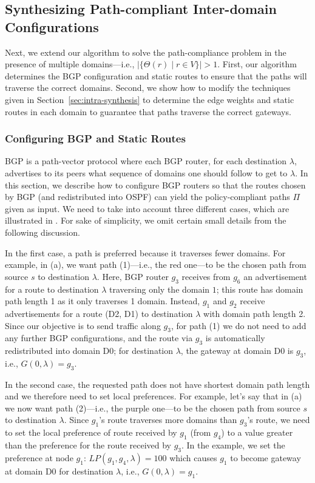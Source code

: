 \subsection{Synthesizing Path-compliant  Inter-domain Configurations}
\label{sec:inter-synthesis}

Next, we extend our algorithm to
solve the path-compliance problem in the presence
of multiple domains---i.e., $|\{\Theta(r) \mid r\in V\}|>1$.
First, our algorithm determines the 
BGP configuration and static routes to ensure that the 
paths will traverse the correct domains.
Second, we show how to modify the 
techniques given in Section~\ref{sec:intra-synthesis}
to determine the edge weights and static routes
 in each domain to guarantee that paths traverse
the correct gateways.


\subsubsection{Configuring BGP and Static Routes}
BGP is a path-vector protocol where each BGP router,
for each destination $\lambda$,
advertises to its peers
what sequence of domains one should follow to get to  $\lambda$.  
In this section, we describe how to configure
BGP routers so that the routes chosen by BGP 
(and redistributed into OSPF) 
can yield the policy-compliant
paths $\Pi$ given as input. 
We need to take into account three different
cases, which are illustrated in .  
For sake of simplicity, we omit certain small details 
from the following discussion.

In the first case, a path is preferred because it traverses fewer domains.
For example, in (a), we want
path (1)---i.e., the red one---to be the chosen path from source $s$ 
to destination $\lambda$.
Here, BGP router $g_3$ receives from $g_6$ an advertisement for a route to destination $\lambda$
traversing only the domain $1$; this route has domain path length 1 as it only traverses 1 domain. 
Instead, $g_1$ and $g_2$ receive advertisements for a route 
(D2, D1)
to destination $\lambda$  with 
domain path length 2. Since our objective is to send traffic along
$g_3$, for path (1) we do not need to add any further BGP configurations,
and the route via $g_3$ is automatically redistributed into domain D0;
for destination $\lambda$, the gateway at domain D0 is $g_3$, i.e.,
$G(0, \lambda) = g_3$.

In the second case, the requested path does not have shortest domain path length
and we therefore need to set local preferences.
For example, let's say that in (a) we now want
path (2)---i.e., the purple one---to be the chosen path from source $s$
to destination $\lambda$. 
Since $g_1$'s route traverses more domains than
 $g_3$'s route,
we need to set the local preference of route received by $g_1$ 
(from $g_4$) to a value greater than the preference for the route received by $g_3$. 
In the example, we set the preference at node $g_1$: 
$LP(g_1, g_4, \lambda) = 100$
which causes $g_1$ to become gateway at domain D0 for destination $\lambda$, i.e., 
$G(0, \lambda) = g_1$.

